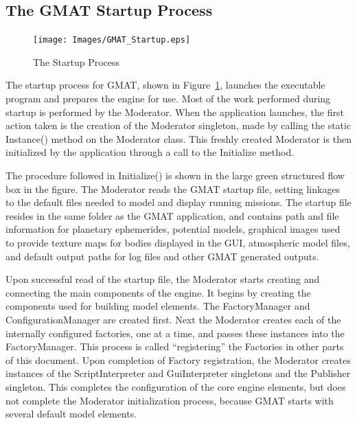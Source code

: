 \subsection{\label{section:GMATStartup}The GMAT Startup Process}

\begin{figure}[htb]
\begin{center}
\texttt{[image: Images/GMAT\_Startup.eps]}
\caption{\label{figure:StartupActivities}The Startup Process}
\end{center}
\end{figure}

The startup process for GMAT, shown in Figure~\ref{figure:StartupActivities}, launches the
executable program and prepares the engine for use.  Most of the work performed during startup is
performed by the Moderator.  When the application launches, the first action taken is the creation
of the Moderator singleton, made by calling the static Instance() method on the Moderator class.
This freshly created Moderator is then initialized by the application through a call to the
Initialize{} method.

The procedure followed in Initialize() is shown in the large green structured flow box in the
figure.  The Moderator reads the GMAT startup file, setting linkages to the default files needed to
model and display running missions.  The startup file resides in the same folder as the GMAT
application, and contains path and file information for planetary ephemerides, potential models,
graphical images used to provide texture maps for bodies displayed in the GUI, atmospheric model
files, and default output paths for log files and other GMAT generated outputs.

Upon successful read of the startup file, the Moderator starts creating and connecting the main
components of the engine.  It begins by creating the components used for building model elements.
The FactoryManager and ConfigurationManager are created first.  Next the Moderator creates each of
the internally configured factories, one at a time, and passes these instances into the
FactoryManager.  This process is called ``registering'' the Factories in other parts of this
document.  Upon completion of Factory registration, the Moderator creates instances of the
ScriptInterpreter and GuiInterpreter singletons and the Publisher singleton.  This completes the
configuration of the core engine elements, but does not complete the Moderator initialization
process, because GMAT starts with several default model elements.

